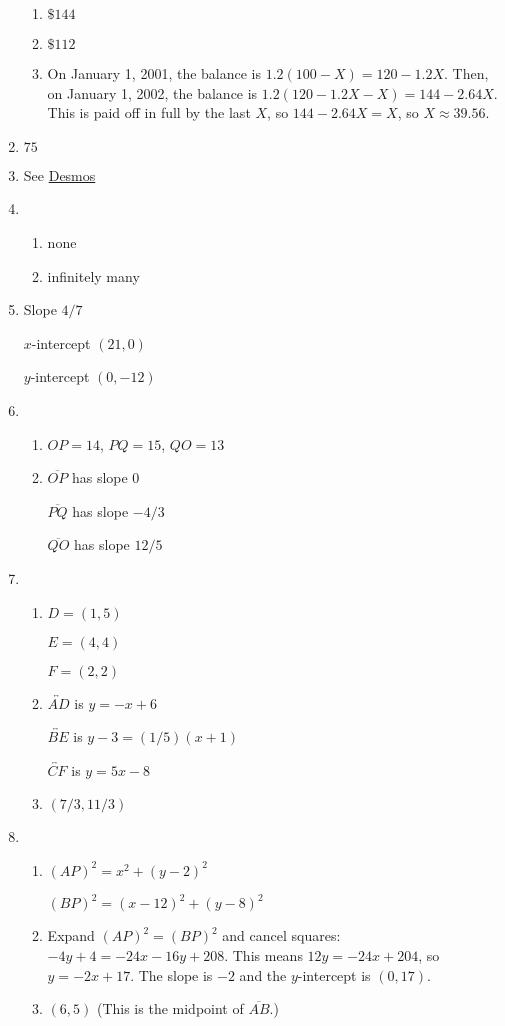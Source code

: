 \documentclass{article}
\begin{document}
\begin{multicols}{2}
\begin{enumerate}
\begin{enumerate}
\item $\$144$
\item $\$112$
\item On January 1, 2001, the balance is $1.2(100 - X) = 120 - 1.2X$. Then, on January 1, 2002, the balance is $1.2(120 - 1.2X - X) = 144 - 2.64X$. This is paid off in full by the last $X$, so $144 - 2.64X = X$, so $X\approx\boxed{39.56}$.
\end{enumerate}
\item $75$
\item See \href{https://www.desmos.com/}{Desmos}
\item \begin{enumerate}
\item none
\item infinitely many
\end{enumerate}
\item Slope $4/7$\par $x$-intercept $(21,0)$\par $y$-intercept $(0,-12)$
\item \begin{enumerate}
\item $OP = 14$, $PQ = 15$, $QO = 13$
\item $\overline{OP}$ has slope 0\par $\overline{PQ}$ has slope $-4/3$\par $\overline{QO}$ has slope $12/5$
\end{enumerate}
\item \begin{enumerate}
\item $D = (1,5)$\par $E = (4,4)$\par $F = (2,2)$
\item $\overleftrightarrow{AD}$ is $y = -x + 6$\par $\overleftrightarrow{BE}$ is $y - 3 = (1/5)(x + 1)$\par $\overleftrightarrow{CF}$ is $y = 5x - 8$
\item $(7/3, 11/3)$
\end{enumerate}
\item \begin{enumerate}
\item $(AP)^2 = x^2 + (y - 2)^2$\par $(BP)^2 = (x - 12)^2 + (y - 8)^2$
\item Expand $(AP)^2 = (BP)^2$ and cancel squares: $-4y + 4 = -24x - 16y + 208$. This means $12y = -24x + 204$, so $y = -2x + 17$. The slope is $\boxed{-2}$ and the $y$-intercept is $\boxed{(0,17)}$.
\item $(6,5)$  (This is the midpoint of $\overline{AB}$.)
\end{enumerate}
\end{enumerate}
\end{multicols}
\end{document}
